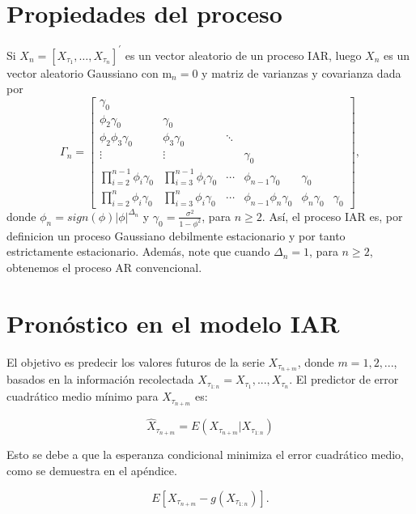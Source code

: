\section{Propiedades del proceso}
Si $X_n=\left[X_{\tau_1}, \ldots, X_{\tau_n}\right]^{\prime}$ es un vector aleatorio de un proceso IAR, 
luego $X_n$ es un vector aleatorio Gaussiano con $\mathrm{m}_n=0$ y matriz de varianzas y covarianza
dada por
$$
\Gamma_n=\left[\begin{array}{cccccc}
\gamma_0 & & & & & \\
\phi_2 \gamma_0 & \gamma_0 & & & & \\
\phi_2\phi_3 \gamma_0 & \phi_3\gamma_0 & \ddots & & & \\
\vdots & \vdots & & \gamma_0 & & \\
\prod_{i=2}^{n-1}\phi_i \gamma_0 & \prod_{i=3}^{n-1}\phi_i \gamma_0 & \cdots & \phi_{n-1}\gamma_0 & \gamma_0 & \\
\prod_{i=2}^{n}\phi_i  \gamma_0 & \prod_{i=3}^{n}\phi_i  \gamma_0 & \cdots & \phi_{n-1}\phi_{n}\gamma_0 & \phi_{n}\gamma_0 & \gamma_0
\end{array}\right],
$$
donde $\phi_{n} = sign(\phi)|\phi|^{\Delta_{n}}$ y $\gamma_0=\frac{\sigma^2}{1-\phi^2}$, para $n \geq 2$. Así,
el proceso IAR es, por definicion un proceso Gaussiano debilmente estacionario y por tanto estrictamente estacionario.
Además, note que cuando $\Delta_n=1$, para $n \geq 2$, obtenemos el proceso AR convencional.

\section{Pronóstico en el modelo IAR}

El objetivo es predecir los valores futuros de la serie $X_{\tau_{n+m}}$,
 donde $m = 1,2,...$, basados en la información recolectada $X_{\tau_{1:n}} = { X_{\tau_1}, ..., X_{\tau_n} }$. 
 El predictor de error cuadrático medio mínimo para $X_{\tau_{n+m}}$ es:

\begin{equation}
\hat{X}_{\tau_{n+m}} = E(X_{\tau_{n+m}}|X_{\tau_{1:n}})
\label{eq:predictorIAR}
\end{equation}

Esto se debe a que la esperanza condicional minimiza el error cuadrático medio, como se demuestra en el apéndice.

\begin{equation}
E \left[ X_{\tau_{n+m}} - g\left( X_{\tau_{1:n}} \right) \right].
\label{eq:ecmIAR}
\end{equation}


